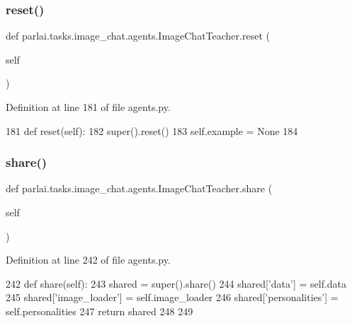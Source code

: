 \subsubsection{\texorpdfstring{reset()}{reset()}}
{\footnotesize\ttfamily def parlai.\+tasks.\+image\+\_\+chat.\+agents.\+Image\+Chat\+Teacher.\+reset (\begin{DoxyParamCaption}\item[{}]{self }\end{DoxyParamCaption})}



Definition at line 181 of file agents.\+py.


\begin{DoxyCode}
181     \textcolor{keyword}{def }reset(self):
182         super().reset()
183         self.example = \textcolor{keywordtype}{None}
184 
\end{DoxyCode}
\mbox{\label{classparlai_1_1tasks_1_1image__chat_1_1agents_1_1ImageChatTeacher_a5208845ef2ccb323991101b60bf76396}} 
\subsubsection{\texorpdfstring{share()}{share()}}
{\footnotesize\ttfamily def parlai.\+tasks.\+image\+\_\+chat.\+agents.\+Image\+Chat\+Teacher.\+share (\begin{DoxyParamCaption}\item[{}]{self }\end{DoxyParamCaption})}



Definition at line 242 of file agents.\+py.


\begin{DoxyCode}
242     \textcolor{keyword}{def }share(self):
243         shared = super().share()
244         shared[\textcolor{stringliteral}{'data'}] = self.data
245         shared[\textcolor{stringliteral}{'image\_loader'}] = self.image\_loader
246         shared[\textcolor{stringliteral}{'personalities'}] = self.personalities
247         \textcolor{keywordflow}{return} shared
248 
249 
\end{DoxyCode}
\mbox{\label{classparlai_1_1tasks_1_1image__chat_1_1agents_1_1ImageChatTeacher_a6028198a57fccc50c4c7f4f294ed1f33}} 
